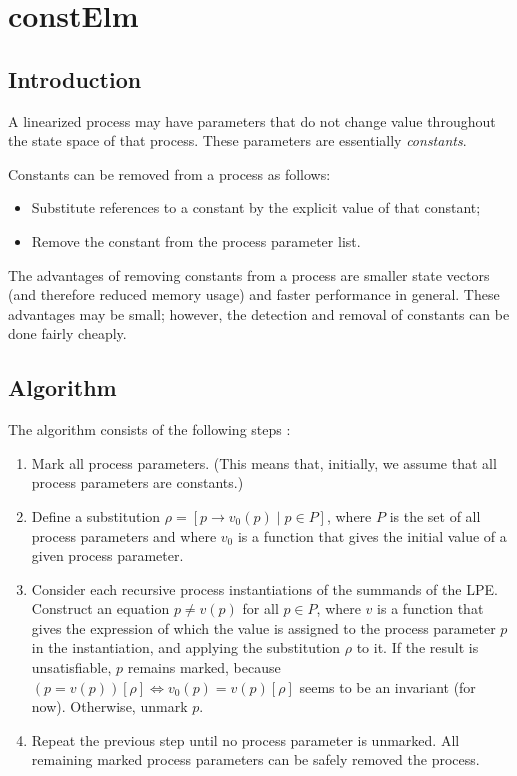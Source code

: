\chapter{constElm}

\section{Introduction}

A linearized process may have parameters that do not change value throughout the state space of that process.
These parameters are essentially \emph{constants}.

Constants can be removed from a process as follows:
\begin{itemize}
\item Substitute references to a constant by the explicit value of that constant;
\item Remove the constant from the process parameter list.
\end{itemize}

The advantages of removing constants from a process are smaller state vectors (and therefore reduced memory usage) and faster performance in general.
These advantages may be small; however, the detection and removal of constants can be done fairly cheaply.

\section{Algorithm}

The algorithm consists of the following steps \cite{groote2001computer}:

\begin{enumerate}

\item Mark all process parameters.
(This means that, initially, we assume that all process parameters are constants.)

\item Define a substitution $\rho = [p \rightarrow v_0(p) \;|\; p \in P]$, where $P$ is the set of all process parameters and where $v_0$ is a function that gives the initial value of a given process parameter.

\item Consider each recursive process instantiations of the summands of the LPE.
Construct an equation $p \neq v(p)$ for all $p \in P$, where $v$ is a function that gives the expression of which the value is assigned to the process parameter $p$ in the instantiation, and applying the substitution $\rho$ to it.
If the result is unsatisfiable, $p$ remains marked, because $(p = v(p))[\rho] \Leftrightarrow v_0(p) = v(p)[\rho]$ seems to be an invariant (for now).
Otherwise, unmark $p$.

\item Repeat the previous step until no process parameter is unmarked.
All remaining marked process parameters can be safely removed the process.

\end{enumerate}

